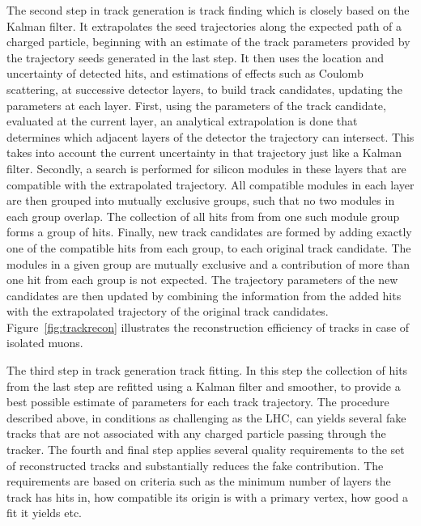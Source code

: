 The second step in track generation is track finding which is closely based on the Kalman filter. It extrapolates the seed trajectories along the expected path of a charged particle, beginning with an estimate of the track parameters provided by the trajectory seeds generated in the last step. It then uses the location and uncertainty of detected hits, and estimations of effects such as Coulomb scattering, at successive detector layers, to build track candidates, updating the parameters at each layer. First, using the parameters of the track candidate, evaluated at the current layer, an analytical extrapolation is done that determines which adjacent layers of the detector the trajectory can intersect. This takes into account the current uncertainty in that trajectory just like a Kalman filter. Secondly, a search is performed for silicon modules in these layers that are compatible with the extrapolated trajectory. All compatible modules in each layer are then grouped into mutually exclusive groups, such that no two modules in each group overlap. The collection of all hits from from one such module group forms a group of hits. Finally, new track candidates are formed by adding exactly one of the compatible hits from each group, to each original track candidate. The modules in a given group are mutually exclusive and a contribution of more than one hit from each group is not expected. The trajectory parameters of the new candidates are then updated by combining the information from the added hits with the extrapolated trajectory of the original track candidates. Figure~\ref{fig:trackrecon} illustrates the reconstruction efficiency of tracks in case of isolated muons.

The third step in track generation track fitting. In this step the collection of hits from the last step are refitted using a Kalman filter and smoother, to provide a best possible estimate of parameters for each track trajectory. The procedure described above, in conditions as challenging as the LHC, can yields several fake tracks that are not associated with any charged particle passing through the tracker. The fourth and final step applies several quality requirements to the set of reconstructed tracks and substantially reduces the fake contribution. The requirements are based on criteria such as the minimum number of layers the track has hits in, how compatible its origin is with a primary vertex, how good a fit it yields etc.

